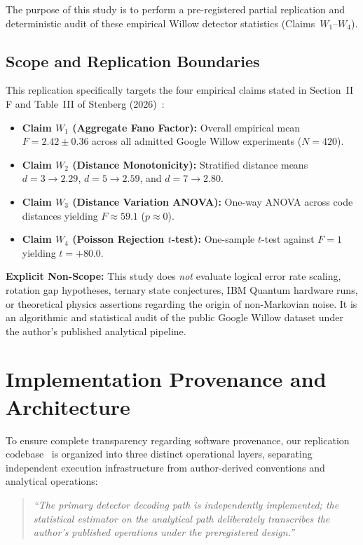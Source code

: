 The purpose of this study is to perform a pre-registered partial replication and deterministic audit of these empirical Willow detector statistics (Claims~$W_1$–$W_4$).

\subsection{Scope and Replication Boundaries}

This replication specifically targets the four empirical claims stated in Section~II\,F and Table~III of Stenberg (2026)~\cite{stenberg2026rotation}:
\begin{itemize}
    \item \textbf{Claim $W_1$ (Aggregate Fano Factor):} Overall empirical mean $F = 2.42 \pm 0.36$ across all admitted Google Willow experiments ($N = 420$).
    \item \textbf{Claim $W_2$ (Distance Monotonicity):} Stratified distance means $d=3 \to 2.29$, $d=5 \to 2.59$, and $d=7 \to 2.80$.
    \item \textbf{Claim $W_3$ (Distance Variation ANOVA):} One-way ANOVA across code distances yielding $F \approx 59.1$ ($p \approx 0$).
    \item \textbf{Claim $W_4$ (Poisson Rejection $t$-test):} One-sample $t$-test against $F=1$ yielding $t = +80.0$.
\end{itemize}

\textbf{Explicit Non-Scope:} This study does \emph{not} evaluate logical error rate scaling, rotation gap hypotheses, ternary state conjectures, IBM Quantum hardware runs, or theoretical physics assertions regarding the origin of non-Markovian noise. It is an algorithmic and statistical audit of the public Google Willow dataset under the author's published analytical pipeline.

\section{Implementation Provenance and Architecture}

To ensure complete transparency regarding software provenance, our replication codebase~\cite{volmax_fano_audit_2026} is organized into three distinct operational layers, separating independent execution infrastructure from author-derived conventions and analytical operations:

\begin{quote}
\itshape
``The primary detector decoding path is independently implemented; the statistical estimator on the analytical path deliberately transcribes the author's published operations under the preregistered design.''
\end{quote}

